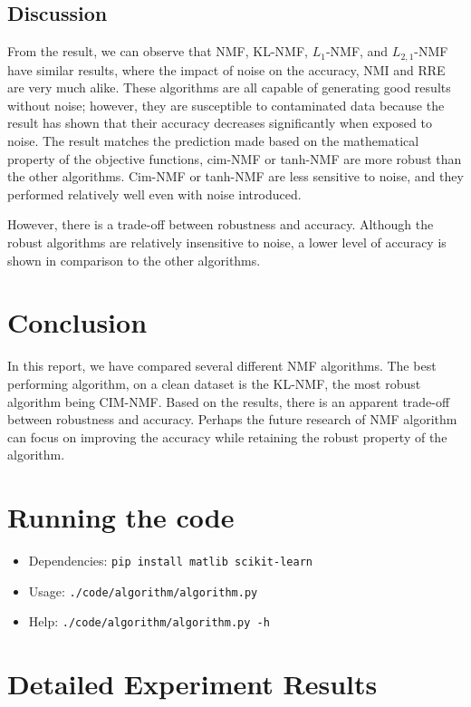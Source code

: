 \documentclass{article} %
\begin{document}
\subsection{Discussion}
From the result, we can observe that NMF, KL-NMF, $L_1$-NMF, and $L_{2,1}$-NMF have similar results, where the impact of noise on the accuracy, NMI and RRE are very much alike. These algorithms are all capable of generating good results without noise; however, they are susceptible to contaminated data because the result has shown that their accuracy decreases significantly when exposed to noise. The result matches the prediction made based on the mathematical property of the objective functions, cim-NMF or tanh-NMF are more robust than the other algorithms. Cim-NMF or tanh-NMF are less sensitive to noise, and they performed relatively well even with noise introduced.

However, there is a trade-off between robustness and accuracy. Although the robust algorithms are relatively insensitive to noise, a lower level of accuracy is shown in comparison to the other algorithms. 

\section{Conclusion}
In this report, we have compared several different NMF algorithms. The best performing algorithm, on a clean dataset is the KL-NMF, the most robust algorithm being CIM-NMF. Based on the results, there is an apparent trade-off between robustness and accuracy. Perhaps the future research of NMF algorithm can focus on improving the accuracy while retaining the robust property of the algorithm.

\printbibliography\appendix

\section{Running the code}
\begin{itemize}
\item Dependencies: \texttt{pip install matlib scikit-learn}
\item Usage: \texttt{./code/algorithm/algorithm.py}
\item Help: \texttt{./code/algorithm/algorithm.py -h}
\end{itemize}

\section{Detailed Experiment Results}
\end{document}
